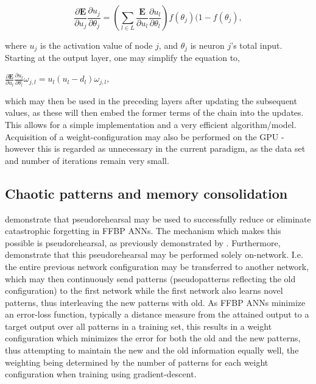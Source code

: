 \begin{equation}
    \frac{\partial \textbf{E}}{\partial u_j}\frac{\partial u_j}{\partial \theta_j} = 
    (\sum_{l \in L}\frac{\textbf{E}}{\partial u_l}\frac{\partial u_l}{\partial \theta_l}) f(\theta_j)(1-f(\theta_j),
\end{equation}

\noindent
where $u_j$ is the activation value of node $j$, and $\theta_j$ is neuron $j$'s total input. Starting at the output layer, one may simplify the equation to,

\begin{center}
\begin{math}
    \frac{\partial \textbf{E}}{\partial u_l} \frac{\partial u_l}{\partial \theta_l} \omega_{j,l} = 
    u_l (u_l - d_l) \omega_{j,l},
\end{math}
\end{center}

which may then be used in the preceding layers after updating the subsequent values, as these will then embed the former terms of the chain into the updates. This allows for a simple implementation and a very efficient algorithm/model. Acquisition of a weight-configuration may also be performed on the GPU - however this is regarded as unnecessary in the current paradigm, as the data set and number of iterations remain very small.



\subsection{Chaotic patterns and memory consolidation}\label{subsection:hpc-pseudopatterns}

\cite{Ans1997} demonstrate that pseudorehearsal may be used to successfully reduce or eliminate catastrophic forgetting in FFBP ANNs. The mechanism which makes this possible is pseudorehearsal, as previously demonstrated by \cite{Robins1995}. Furthermore, \cite{Ans1997} demonstrate that this pseudorehearsal may be performed solely on-network. I.e. the entire previous network configuration may be transferred to another network, which may then continuously send patterns (pseudopatterns reflecting the old configuration) to the first network while the first network also learns novel patterns, thus interleaving the new patterns with old. As FFBP ANNs minimize an error-loss function, typically a distance measure from the attained output to a target output over all patterns in a training set, this results in a weight configuration which minimizes the error for both the old and the new patterns, thus attempting to maintain the new and the old information equally well, the weighting being determined by the number of patterns for each weight configuration when training using gradient-descent.
\\

